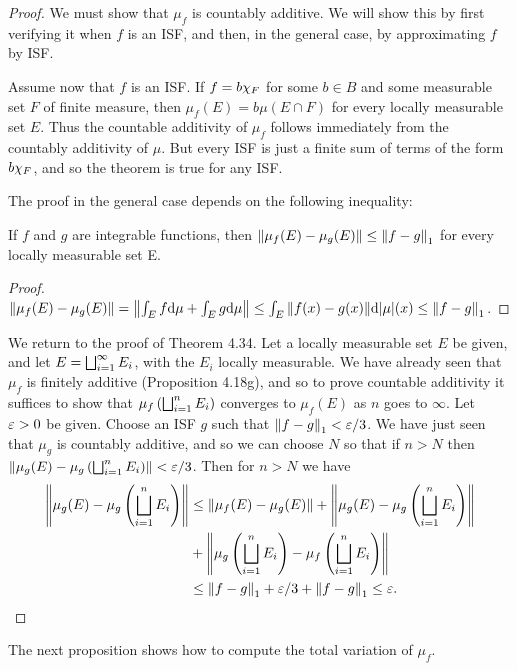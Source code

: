 \begin{proof}

We must show that $\mu_f$ is countably additive. We will show this by first verifying it when $f$ is an ISF, and then, in the general case, by approximating $f$ by ISF.

Assume now that $f$ is an ISF. If $f=b\chi_{F}$ for some $b\in B$ and some measurable set $F$ of finite measure, then $\mu_f(E)=b\mu(E\cap F)$ for every locally measurable set $E$. Thus the countable additivity of $\mu_f$ follows immediately from the countably additivity of $\mu$. But every ISF is just a finite sum of terms of the form $b\chi_{F}$, and so the theorem is true for any ISF.

The proof in the general case depends on the following inequality:

\begin{lemma}
If $f$ and $g$ are integrable functions, then $\norm{\mu_f(E)-\mu_g(E)}\leq\norm{f-g}_1$ for every locally measurable set E.
\end{lemma}

\begin{proof}
$\norm{\mu_f(E)-\mu_g(E)}=\norm{\int_Ef\dd\mu+\int_Eg\dd\mu}\leq\int_E\norm{f(x)-g(x)}\dd|\mu|(x)\allowbreak\leq\norm{f-g}_1$.
\end{proof}

We return to the proof of Theorem 4.34. Let a locally measurable set $E$ be given, and let $E=\bigsqcup_{i=1}^\infty E_i$, with the $E_i$ locally measurable. We have already seen that $\mu_f$ is finitely additive (Proposition 4.18g), and so to prove countable additivity it suffices to show that $\mu_f\left(\bigsqcup_{i=1}^n E_i\right)$ converges to $\mu_f(E)$ as $n$ goes to $\infty$. Let $\varepsilon>0$ be given. Choose an ISF $g$ such that $\norm{f-g}_1<\varepsilon/3$. We have just seen that $\mu_g$ is countably additive, and so we can choose $N$ so that if $n>N$ then $\norm{\mu_g(E)-\mu_g\left(\bigsqcup_{i=1}^nE_i\right)}<\varepsilon/3$. Then for $n>N$ we have
\begin{align*} %
    \norm{\mu_g(E)-\mu_g\br{\bigdu_{i=1}^nE_i}}&\leq\norm{\mu_f(E)-\mu_g(E)}+\norm{\mu_g(E)-\mu_g\br{\bigdu_{i=1}^nE_i}}\\
    &+\norm{\mu_g\br{\bigdu_{i=1}^nE_i}-\mu_f\br{\bigdu_{i=1}^nE_i}}\\
    &\leq\norm{f-g}_1+\ep/3+\norm{f-g}_1\leq\ep.
\end{align*}
\end{proof}

The next proposition shows how to compute the total variation of $\mu_f$.


